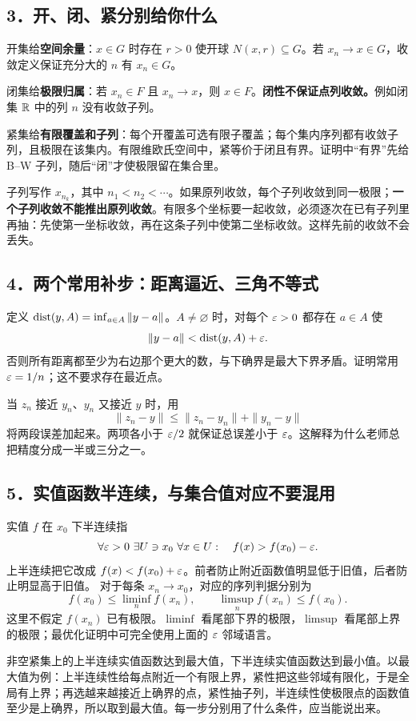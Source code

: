 \subsection*{3．开、闭、紧分别给你什么}
开集给\textbf{空间余量}：$x\in G$ 时存在 $r>0$ 使开球 $N(x,r)\subseteq G$。若 $x_n\to x\in G$，收敛定义保证充分大的 $n$ 有 $x_n\in G$。

闭集给\textbf{极限归属}：若 $x_n\in F$ 且 $x_n\to x$，则 $x\in F$。\textbf{闭性不保证点列收敛。}例如闭集 $\mathbb{R}$ 中的列 $n$ 没有收敛子列。

紧集给\textbf{有限覆盖和子列}：每个开覆盖可选有限子覆盖；每个集内序列都有收敛子列，且极限在该集内。有限维欧氏空间中，紧等价于闭且有界。证明中“有界”先给 B--W 子列，随后“闭”才使极限留在集合里。

子列写作 $x_{n_k}$，其中 $n_1<n_2<\cdots$。如果原列收敛，每个子列收敛到同一极限；\textbf{一个子列收敛不能推出原列收敛}。有限多个坐标要一起收敛，必须逐次在已有子列里再抽：先使第一坐标收敛，再在这条子列中使第二坐标收敛。这样先前的收敛不会丢失。

\subsection*{4．两个常用补步：距离逼近、三角不等式}
定义 $\operatorname{dist}(y,A)=\inf_{a\in A}\|y-a\|$。$A\ne\varnothing$ 时，对每个 $\varepsilon>0$ 都存在 $a\in A$ 使
\[\|y-a\|<\operatorname{dist}(y,A)+\varepsilon.\]
否则所有距离都至少为右边那个更大的数，与下确界是最大下界矛盾。证明常用 $\varepsilon=1/n$；这不要求存在最近点。

当 $z_n$ 接近 $y_n$、$y_n$ 又接近 $y$ 时，用
\[\|z_n-y\|\le\|z_n-y_n\|+\|y_n-y\|\]
将两段误差加起来。两项各小于 $\varepsilon/2$ 就保证总误差小于 $\varepsilon$。这解释为什么老师总把精度分成一半或三分之一。

\subsection*{5．实值函数半连续，与集合值对应不要混用}
实值 $f$ 在 $x_0$ 下半连续指
\[\forall\varepsilon>0\ \exists U\ni x_0\ \forall x\in U:\quad f(x)>f(x_0)-\varepsilon.\]
上半连续把它改成 $f(x)<f(x_0)+\varepsilon$。前者防止附近函数值明显低于旧值，后者防止明显高于旧值。
对于每条 $x_n\to x_0$，对应的序列判据分别为
\[f(x_0)\le\liminf_n f(x_n),\qquad
\limsup_n f(x_n)\le f(x_0).\]
这里不假定 $f(x_n)$ 已有极限。$\liminf$ 看尾部下界的极限，$\limsup$ 看尾部上界的极限；最优化证明中可完全使用上面的 $\varepsilon$ 邻域语言。

非空紧集上的上半连续实值函数达到最大值，下半连续实值函数达到最小值。以最大值为例：上半连续性给每点附近一个有限上界，紧性把这些邻域有限化，于是全局有上界；再选越来越接近上确界的点，紧性抽子列，半连续性使极限点的函数值至少是上确界，所以取到最大值。每一步分别用了什么条件，应当能说出来。

